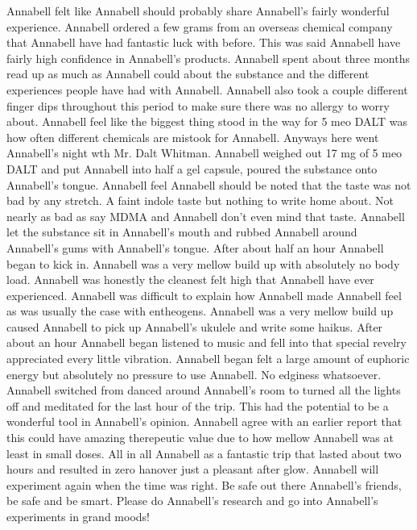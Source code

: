 \documentclass[12pt]{book}
\begin{document}
Annabell felt like Annabell should probably share Annabell's fairly wonderful experience. Annabell ordered a few grams from an overseas chemical company that Annabell have had fantastic luck with before. This was said Annabell have fairly high confidence in Annabell's products. Annabell spent about three months read up as much as Annabell could about the substance and the different experiences people have had with Annabell. Annabell also took a couple different finger dips throughout this period to make sure there was no allergy to worry about. Annabell feel like the biggest thing stood in the way for 5 meo DALT was how often different chemicals are mistook for Annabell. Anyways here went Annabell's night wth Mr. Dalt Whitman. Annabell weighed out 17 mg of 5 meo DALT and put Annabell into half a gel capsule, poured the substance onto Annabell's tongue. Annabell feel Annabell should be noted that the taste was not bad by any stretch. A faint indole taste but nothing to write home about. Not nearly as bad as say MDMA and Annabell don't even mind that taste. Annabell let the substance sit in Annabell's mouth and rubbed Annabell around Annabell's gums with Annabell's tongue. After about half an hour Annabell began to kick in. Annabell was a very mellow build up with absolutely no body load. Annabell was honestly the cleanest felt high that Annabell have ever experienced. Annabell was difficult to explain how Annabell made Annabell feel as was usually the case with entheogens. Annabell was a very mellow build up caused Annabell to pick up Annabell's ukulele and write some haikus. After about an hour Annabell began listened to music and fell into that special revelry appreciated every little vibration. Annabell began felt a large amount of euphoric energy but absolutely no pressure to use Annabell. No edginess whatsoever. Annabell switched from danced around Annabell's room to turned all the lights off and meditated for the last hour of the trip. This had the potential to be a wonderful tool in Annabell's opinion. Annabell agree with an earlier report that this could have amazing therepeutic value due to how mellow Annabell was at least in small doses. All in all Annabell as a fantastic trip that lasted about two hours and resulted in zero hanover just a pleasant after glow. Annabell will experiment again when the time was right. Be safe out there Annabell's friends, be safe and be smart. Please do Annabell's research and go into Annabell's experiments in grand moods!
\end{document}
